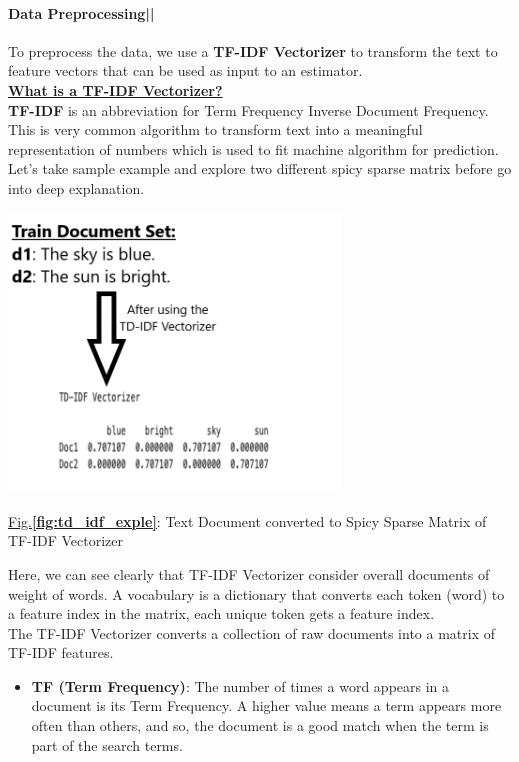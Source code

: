 \documentclass[11.5pt]{article}
\begin{document}
\begin{multicols}{2}
\paragraph{Data Preprocessing||}
To preprocess the data, we use a \textbf{TF-IDF Vectorizer} to transform the text to feature vectors that can be used as input to an estimator.\\
\newline
\underline{\textbf{What is a TF-IDF Vectorizer?}}\\
\textbf{TF-IDF} is an abbreviation for Term Frequency Inverse Document Frequency. This is very common algorithm to transform text into a meaningful representation of numbers which is used to fit machine algorithm for prediction. Let’s take sample example and explore two different spicy sparse matrix before go into deep explanation.
\begin{center}
    \centering
    \qquad
    \includegraphics[width=8.8cm]{td-idf vect.png}
    \caption{\underline{Fig.\textbf{\ref{fig:td_idf_exple}}}: Text Document converted to Spicy Sparse Matrix of TF-IDF Vectorizer}
    \label{fig:td_idf_exple}
\end{center}
Here, we can see clearly that TF-IDF Vectorizer consider overall documents of weight of words. A vocabulary is a dictionary that converts each token (word) to a feature index in the matrix, each unique token gets a feature index.\\
The TF-IDF Vectorizer converts a collection of raw documents into a matrix of TF-IDF features.
\begin{itemize}
    \item \textbf{TF (Term Frequency)}: The number of times a word appears in a document is its Term Frequency. A higher value means a term appears more often than others, and so, the document is a good match when the term is part of the search terms.

\end{itemize}
\end{multicols}
\end{document}
